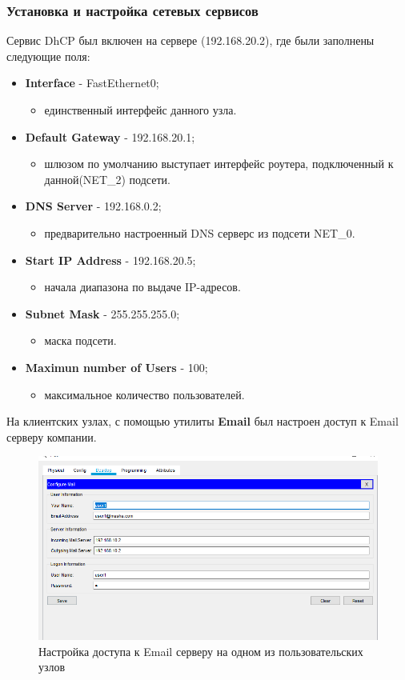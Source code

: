 \documentclass[14pt,a4paper,report]{report}
\begin{document}
\subsubsection{Установка и настройка сетевых сервисов}
Сервис DhCP был включен на сервере (192.168.20.2), где были заполнены следующие поля:
\begin{itemize}
\item \textbf{Interface} - FastEthernet0;
\begin{itemize}
\item единственный интерфейс данного узла.
\end{itemize}
\item \textbf{Default Gateway} - 192.168.20.1;
\begin{itemize}
\item шлюзом по умолчанию выступает интерфейс роутера, подключенный к данной(NET\_2) подсети.
\end{itemize}
\item \textbf{DNS Server} - 192.168.0.2;
\begin{itemize}
\item предварительно настроенный DNS серверс из подсети NET\_0.
\end{itemize}
\item \textbf{Start IP Address} - 192.168.20.5;
\begin{itemize}
\item начала диапазона по выдаче IP-адресов.
\end{itemize}
\item \textbf{Subnet Mask} - 255.255.255.0;
\begin{itemize}
\item маска подсети.
\end{itemize}
\item \textbf{Maximun number of Users} - 100;
\begin{itemize}
\item максимальное количество пользователей.
\end{itemize}
\end{itemize}
На клиентских узлах, с помощью утилиты \textbf{Email} был настроен доступ к Email серверу компании.
\begin{figure}[h]
  \centering
  \includegraphics[width=.7\textwidth]{img/7}
  \caption{Настройка доступа к Email серверу на одном из пользовательских узлов}
\end{figure}
\end{document}
